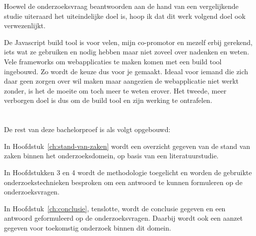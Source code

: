 Hoewel de onderzoeksvraag beantwoorden aan de hand van een vergelijkende studie uiteraard het uiteindelijke doel is, hoop ik dat dit werk volgend doel ook verwezenlijkt.

De Javascript build tool is voor velen, mijn co-promotor en mezelf erbij gerekend, iets wat ze gebruiken en nodig hebben maar niet zoveel over nadenken en weten. Vele frameworks om webapplicaties te maken komen met een build tool ingebouwd. Zo wordt de keuze dus voor je gemaakt. Ideaal voor iemand die zich daar geen zorgen over wil maken maar aangezien de webapplicatie niet werkt zonder, is het de moeite om toch meer te weten erover. Het tweede, meer verborgen doel is dus om de build tool en zijn werking te ontrafelen.

\section{}
\label{sec:opzet-bachelorproef}


De rest van deze bachelorproef is als volgt opgebouwd:

In Hoofdstuk~\ref{ch:stand-van-zaken} wordt een overzicht gegeven van de stand van zaken binnen het onderzoeksdomein, op basis van een literatuurstudie.

In Hoofdstukken 3 en 4 wordt de methodologie toegelicht en worden de gebruikte onderzoekstechnieken besproken om een antwoord te kunnen formuleren op de onderzoeksvragen.


In Hoofdstuk~\ref{ch:conclusie}, tenslotte, wordt de conclusie gegeven en een antwoord geformuleerd op de onderzoeksvragen. Daarbij wordt ook een aanzet gegeven voor toekomstig onderzoek binnen dit domein.

